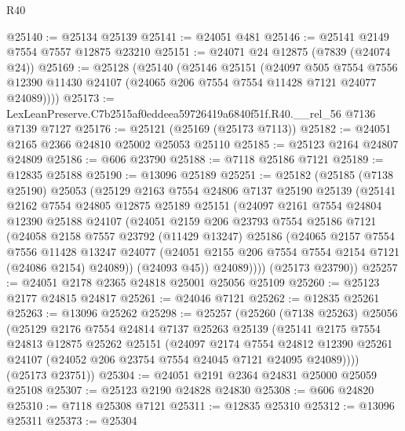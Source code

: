 \begin{lexlean}{R40}
\begin{coremodule}
@25140 := @25134 @25139
@25141 := @24051 @481
@25146 := @25141 @2149 @7554 @7557 @12875 @23210
@25151 := @24071 @24 @12875 (@7839 (@24074 @24))
@25169 := @25128
    (@25140
      (@25146
        @25151
        (@24097
          @505
          @7554
          @7556
          @12390
          @11430
          @24107
          (@24065 @206 @7554 @7554 @11428 @7121 @24077 @24089))))
@25173 := LexLeanPreserve.C7b2515af0eddeea59726419a6840f51f.R40.__rel_56 @7136 @7139 @7127
@25176 := @25121 (@25169 (@25173 @7113))
@25182 := @24051 @2165 @2366 @24810 @25002 @25053 @25110
@25185 := @25123 @2164 @24807 @24809
@25186 := @606 @23790
@25188 := @7118 @25186 @7121
@25189 := @12835 @25188
@25190 := @13096 @25189
@25251 := @25182
    (@25185
      (@7138 @25190)
      @25053
      (@25129
        @2163
        @7554
        @24806
        @7137
        @25190
        @25139
        (@25141
          @2162
          @7554
          @24805
          @12875
          @25189
          @25151
          (@24097
            @2161
            @7554
            @24804
            @12390
            @25188
            @24107
            (@24051
              @2159
              @206
              @23793
              @7554
              @25186
              @7121
              (@24058
                @2158
                @7557
                @23792
                (@11429 @13247)
                @25186
                (@24065
                  @2157
                  @7554
                  @7556
                  @11428
                  @13247
                  @24077
                  (@24051 @2155 @206 @7554 @7554 @2154 @7121 (@24086 @2154) @24089))
                (@24093 @45))
              @24089))))
      (@25173 @23790))
@25257 := @24051 @2178 @2365 @24818 @25001 @25056 @25109
@25260 := @25123 @2177 @24815 @24817
@25261 := @24046 @7121
@25262 := @12835 @25261
@25263 := @13096 @25262
@25298 := @25257
    (@25260
      (@7138 @25263)
      @25056
      (@25129
        @2176
        @7554
        @24814
        @7137
        @25263
        @25139
        (@25141
          @2175
          @7554
          @24813
          @12875
          @25262
          @25151
          (@24097
            @2174
            @7554
            @24812
            @12390
            @25261
            @24107
            (@24052 @206 @23754 @7554 @24045 @7121 @24095 @24089))))
      (@25173 @23751))
@25304 := @24051 @2191 @2364 @24831 @25000 @25059 @25108
@25307 := @25123 @2190 @24828 @24830
@25308 := @606 @24820
@25310 := @7118 @25308 @7121
@25311 := @12835 @25310
@25312 := @13096 @25311
@25373 := @25304

\end{coremodule}
\end{lexlean}
